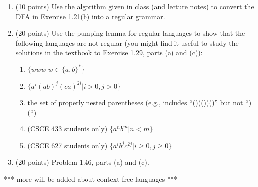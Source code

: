 \documentclass[12pt]{article}
\theoremstyle{definition}
\begin{document}
\begin{enumerate}
\item (10 points) Use the algorithm given in class (and lecture notes)
to convert the DFA in Exercise 1.21(b) into a regular grammar.

\item (20 points) Use the pumping lemma for regular languages
to show that the following languages are not regular
(you might find it useful to study the solutions in the textbook
to Exercise 1.29, parts (a) and (c)):
  \begin{enumerate}
  \item $\{www | w \in \{a,b\}^*\}$
  \item $\{a^i (ab)^j (ca)^{2i} | i > 0, j > 0 \}$
  \item the set of properly nested parentheses (e.g., includes ``()(())()''
        but not ``)(``)
  \item (CSCE 433 students only) $\{a^n b^m | n < m \}$
  \item (CSCE 627 students only) $\{a^i b^j c^{2j} | i \ge 0, j \ge 0 \}$
  \end{enumerate}

\item (20 points) Problem 1.46, parts (a) and (c).

\end{enumerate}

*** more will be added about context-free languages ***
\end{document}
